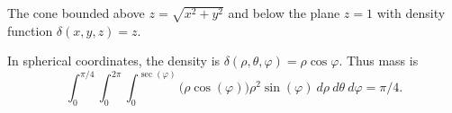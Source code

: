 {
The cone bounded above $z=\sqrt{x^2+y^2}$ and below the plane $z=1$ with density function $\delta(x,y,z) = z$.
\label{ex:13_07_ex_34}
}
{In spherical coordinates, the density is $\delta(\rho,\theta,\varphi) = \rho\cos\varphi$. Thus mass is
$$\int_0^{\pi/4}\int_0^{2\pi}\int_{0}^{\sec(\varphi)} \big(\rho\cos(\varphi)\big)\rho^2\sin(\varphi)\ d\rho\ d\theta\ d\varphi = \pi/4.$$

}
